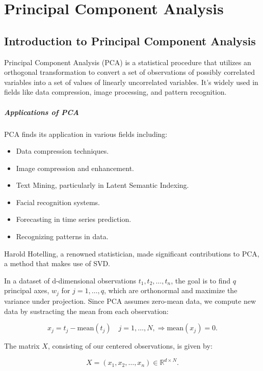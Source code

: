 \chapter{Principal Component Analysis}
\section{Introduction to Principal Component Analysis}

Principal Component Analysis (PCA) is a statistical procedure that utilizes an orthogonal transformation to convert a set of observations of possibly correlated variables into a set of values of linearly uncorrelated variables. It's widely used in fields like data compression, image processing, and pattern recognition.

\paragraph{Applications of PCA}
PCA finds its application in various fields including:
\begin{itemize}
    \setlength\itemsep{0.1em}
    \item Data compression techniques.
    \item Image compression and enhancement.
    \item Text Mining, particularly in Latent Semantic Indexing.
    \item Facial recognition systems.
    \item Forecasting in time series prediction.
    \item Recognizing patterns in data.
\end{itemize}

Harold Hotelling, a renowned statistician, made significant contributions to PCA, a method that makes use of SVD.

In a dataset of d-dimensional observations \( t_1, t_2, \ldots, t_n \), the goal is to find \( q \) principal axes, \( w_j \) for \( j = 1, \ldots, q \), which are orthonormal and maximize the variance under projection.
Since PCA assumes zero-mean data, we compute new data by sustracting the mean from each observation:

\[
x_j = t_j - \text{mean}(t_j) \quad j=1,\ldots,N, \Rightarrow \text{mean}(x_j) = 0.
\]

The matrix \( X \), consisting of our centered observations, is given by:

\[
X = (x_1, x_2, \ldots, x_n) \in \mathbb{R}^{d \times N}.
\]

